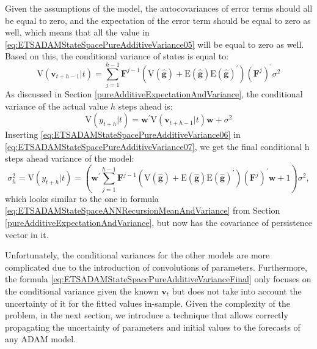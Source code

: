 \documentclass[
]{book}
\theoremstyle{definition}
\theoremstyle{definition}
\theoremstyle{definition}
\theoremstyle{definition}
\theoremstyle{remark}
\begin{document}
Given the assumptions of the model, the autocovariances of error terms should all be equal to zero, and the expectation of the error term should be equal to zero as well, which means that all the value in \eqref{eq:ETSADAMStateSpacePureAdditiveVariance05} will be equal to zero as well. Based on this, the conditional variance of states is equal to:
\begin{equation}
    \mathrm{V}(\mathbf{v}_{t+h-1}|t) = \sum_{j=1}^{h-1} \mathbf{F}^{j-1} \left( \mathrm{V} (\hat{\mathbf{g}}) + \mathrm{E} (\hat{\mathbf{g}}) \mathrm{E} (\hat{\mathbf{g}})^\prime \right) (\mathbf{F}^{j})^\prime \sigma^2
  \label{eq:ETSADAMStateSpacePureAdditiveVariance06}
\end{equation}
As discussed in Section \ref{pureAdditiveExpectationAndVariance}, the conditional variance of the actual value \(h\) steps ahead is:
\begin{equation}
    \mathrm{V}(y_{t+h}|t) = \mathbf{w}^\prime \mathrm{V}(\mathbf{v}_{t+h-1}|t) \mathbf{w} + \sigma^2
  \label{eq:ETSADAMStateSpacePureAdditiveVariance07}
\end{equation}
Inserting \eqref{eq:ETSADAMStateSpacePureAdditiveVariance06} in \eqref{eq:ETSADAMStateSpacePureAdditiveVariance07}, we get the final conditional h steps ahead variance of the model:
\begin{equation}
    \sigma^2_h = \mathrm{V}(y_{t+h}|t) = \left(\mathbf{w}^\prime \sum_{j=1}^{h-1} \mathbf{F}^{j-1} \left( \mathrm{V} (\hat{\mathbf{g}}) + \mathrm{E} (\hat{\mathbf{g}}) \mathrm{E} (\hat{\mathbf{g}})^\prime \right) (\mathbf{F}^{j})^\prime \mathbf{w} + 1 \right)\sigma^2,
  \label{eq:ETSADAMStateSpacePureAdditiveVarianceFinal}
\end{equation}
which looks similar to the one in formula \eqref{eq:ETSADAMStateSpaceANNRecursionMeanAndVariance} from Section \ref{pureAdditiveExpectationAndVariance}, but now has the covariance of persistence vector in it.

Unfortunately, the conditional variances for the other models are more complicated due to the introduction of convolutions of parameters. Furthermore, the formula \eqref{eq:ETSADAMStateSpacePureAdditiveVarianceFinal} only focuses on the conditional variance given the known \(\mathbf{v}_t\) but does not take into account the uncertainty of it for the fitted values in-sample. Given the complexity of the problem, in the next section, we introduce a technique that allows correctly propagating the uncertainty of parameters and initial values to the forecasts of any ADAM model.
\end{document}
